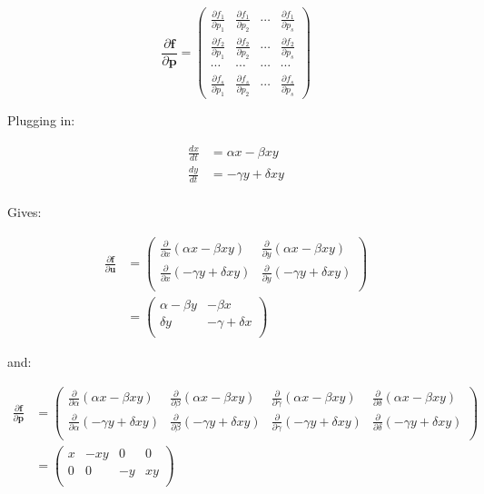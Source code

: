 \documentclass[nobib]{tufte-handout}
\newcommand{\fv}[0]{\mathbf{f}}
\newcommand{\uv}[0]{\mathbf{u}}
\newcommand{\pv}[0]{\mathbf{p}}
\begin{document}
$$\frac{\partial \fv}{\partial \pv}
   =\left(\begin{array}{cccc}
     \frac{\partial f_{1}}{\partial p_{1}} & \frac{\partial f_{1}}{\partial p_{2}} & \cdots & \frac{\partial f_{1}}{\partial p_{s}}\\
     \frac{\partial f_{2}}{\partial p_{1}} & \frac{\partial f_{2}}{\partial p_{2}} & \cdots & \frac{\partial f_{2}}{\partial p_{s}}\\
     \cdots & \cdots & \cdots & \cdots\\
     \frac{\partial f_{s}}{\partial p_{1}} & \frac{\partial f_{s}}{\partial p_{2}} & \cdots & \frac{\partial f_{s}}{\partial p_{s}}
   \end{array}\right)$$

Plugging in:

\begin{align}
   \frac{dx}{dt} &= \alpha x - \beta x y\\
   \frac{dy}{dt} &= - \gamma y + \delta x y\\
   \end{align}

Gives:

\begin{align}
    \frac{\partial \fv}{\partial \uv}&=\left(\begin{array}{cc}
     \frac{\partial }{\partial x} (\alpha x - \beta x y) & \frac{\partial}{\partial y} (\alpha x - \beta x y) \\
     \frac{\partial }{\partial x} (- \gamma y + \delta x y) & \frac{\partial}{\partial y} (- \gamma y + \delta x y) \\
   \end{array}\right)\\
   &=\left(\begin{array}{cc}
     \alpha - \beta y & -\beta x \\
     \delta y       & -\gamma + \delta x \\
   \end{array}\right)
\end{align}

and:

\begin{align}\frac{\partial \fv}{\partial \pv} &=\left(\begin{array}{cccc}
   \frac{\partial }{\partial \alpha} (\alpha x - \beta x y) & \frac{\partial }{\partial \beta} (\alpha x - \beta x y) &
   \frac{\partial }{\partial \gamma} (\alpha x - \beta x y) & \frac{\partial }{\partial \delta} (\alpha x - \beta x y)\\
   \frac{\partial }{\partial \alpha} (-\gamma y + \delta x y) & \frac{\partial }{\partial \beta} (-\gamma y + \delta x y) &
   \frac{\partial }{\partial \gamma} (-\gamma y + \delta x y) & \frac{\partial }{\partial \delta} (-\gamma y + \delta x y)\\
   \end{array}\right)\\
   &=\left(\begin{array}{cccc}
   x & -x y & 0 & 0 \\
   0 & 0 & -y & xy \\
   \end{array}\right)\end{align}
\end{document}
